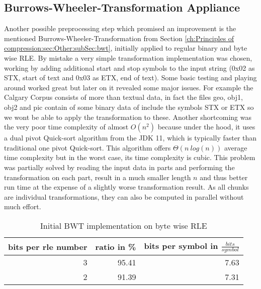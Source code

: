 \subsection{Burrows-Wheeler-Transformation Appliance}
\par{
Another possible preprocessing step which promised an improvement is the mentioned Burrows-Wheeler-Transformation from Section \ref{ch:Principles of compression:sec:Other:subSec:bwt}, initially applied to regular binary and byte wise RLE. By mistake a very simple transformation implementation was chosen, working by adding additional start and stop symbols to the input string (0x02 as STX, start of text and 0x03 as ETX, end of text). Some basic testing and playing around worked great but later on it revealed some major issues. For example the Calgary Corpus consists of more than textual data, in fact the files geo, obj1, obj2 and pic contain of some binary data of include the symbols STX or ETX so we wont be able to apply the transformation to these. Another shortcoming was the very poor time complexity of almost $O (n^2)$ because under the hood, it uses a dual pivot Quick-sort algorithm from the JDK 11, which is typically faster than traditional one pivot Quick-sort. This algorithm offers $\Theta (n \: log(n))$ average time complexity but in the worst case, its time complexity is cubic. This problem was partially solved by reading the input data in parts and performing the transformation on each part, result in a much smaller length $n$ and thus better run time at the expense of a slightly worse transformation result. As all chunks are individual transformations, they can also be computed in parallel without much effort.

\begin{table}[H]
	\centering
	\begin{tabular}{r|r|r}	
		bits per rle number & ratio in \% & bits per symbol in $\frac{bits}{symbol}$\\
		\hline
		3 & 95.41 & 7.63\\
		2 & 91.39 & 7.31 \\
	\end{tabular}
	\caption{Initial BWT implementation on byte wise RLE}
	\label{tab:t11 Simple Burrows Wheeler Transformation on byte wise RLE}
\end{table}
}
